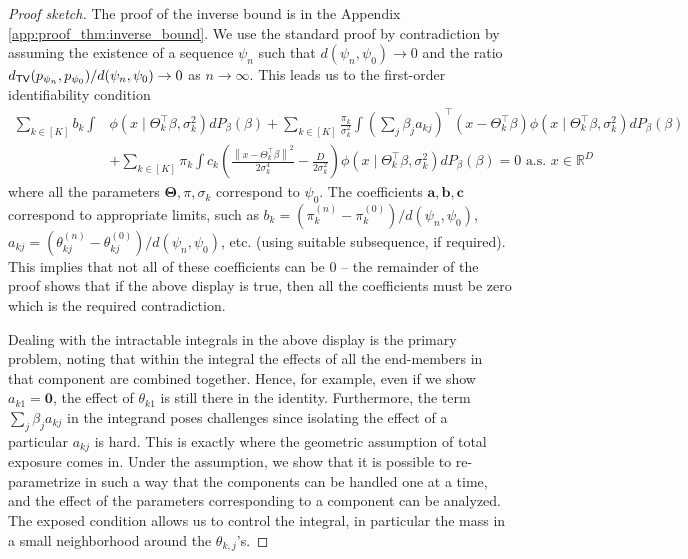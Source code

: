 \documentclass[bj,authoryear]{imsart}
\theoremstyle{plain}
\theoremstyle{remark}
\newtheorem{remark}{Remark}
\def\bTheta{{\boldsymbol\Theta}}
\def\ba{\mathbf{a}}
\def\bb{\mathbf{b}}
\def\bc{\mathbf{c}}
\def\bbR{\mathbb{R}}
\def\norm#1{\left\|#1\right\|}
\def\TV{{\sf TV}}
\def\bTheta{\boldsymbol{\Theta}}
\begin{document}
\begin{proof}[Proof sketch]
The proof of the inverse bound is in the Appendix \ref{app:proof_thm:inverse_bound}. We use the standard proof by contradiction by assuming the existence of a sequence $\psi_n$ such that $d(\psi_n,\psi_0)\to 0$ and the ratio  $d_{\TV}(p_{\psi_n},p_{\psi_0})/d(\psi_n,\psi_0) \to 0$ as $n\to\infty$. This leads us to the first-order identifiability condition
\begin{align*}
        \sum_{k\in[K]} b_k\int &\phi(x\mid \Theta_k^\top\beta, \sigma_k^2)dP_{\beta}(\beta) + \sum_{k\in[K]} \frac{\pi_k}{\sigma_k^2} \int \left(\sum_j \beta_j a_{kj}\right)^\top \left(x - \Theta_k^\top\beta\right) \phi(x\mid \Theta_k^\top\beta,\sigma_k^2)dP_{\beta}(\beta) \nonumber\\
        &+ \sum_{k\in[K]} \pi_k \int c_k\left(\frac{\norm{x - \Theta_k^\top\beta}^2}{2\sigma_k^4} - \frac{D}{2\sigma_k^2}\right)\phi(x\mid \Theta_k^\top\beta,\sigma_k^2) dP_{\beta}(\beta) = 0 \text{ a.s. } x\in\bbR^D
    \end{align*}
where all the parameters $\bTheta, \pi, \sigma_k$ correspond to $\psi_0$. The coefficients $\ba, \bb, \bc$ correspond to appropriate limits, such as $b_k = (\pi_k^{(n)} - \pi_k^{(0)}) / d(\psi_n, \psi_0)$, $a_{kj} = (\theta_{kj}^{(n)} - \theta_{kj}^{(0)})/d(\psi_n, \psi_0)$, etc. (using suitable subsequence, if required). This implies that not all of these coefficients can be 0 -- the remainder of the proof shows that if the above display is true, then all the coefficients must be zero which is the required contradiction. 

Dealing with the intractable integrals in the above display is the primary problem, noting that within the integral the effects of all the end-members in that component are combined together. Hence, for example, even if we show $a_{k1}=\boldsymbol{0}$, the effect of $\theta_{k1}$ is still there in the identity. Furthermore, the term $\sum_j \beta_j a_{kj}$ in the integrand poses challenges since isolating the effect of a particular $a_{kj}$ is hard. This is exactly where the geometric assumption of total exposure comes in. Under the assumption, we show that it is possible to re-parametrize in such a way that the components can be handled one at a time, and the effect of the parameters corresponding to a component can be analyzed. The exposed condition allows us to control the integral, in particular the mass in a small neighborhood around the $\theta_{k,j}$'s.
\end{proof}
\end{document}
